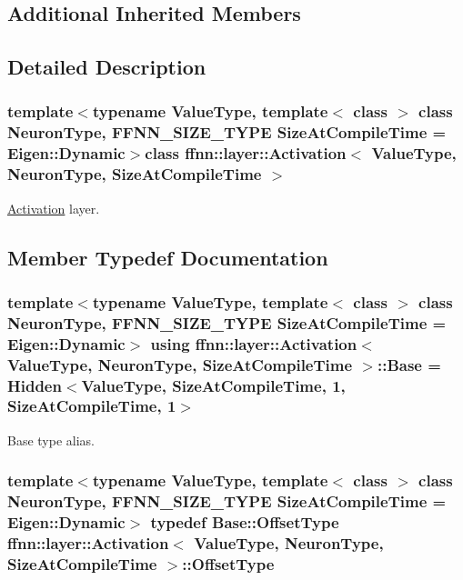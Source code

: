 \subsection*{Additional Inherited Members}


\subsection{Detailed Description}
\subsubsection*{template$<$typename Value\-Type, template$<$ class $>$ class Neuron\-Type, F\-F\-N\-N\-\_\-\-S\-I\-Z\-E\-\_\-\-T\-Y\-P\-E Size\-At\-Compile\-Time = Eigen\-::\-Dynamic$>$class ffnn\-::layer\-::\-Activation$<$ Value\-Type, Neuron\-Type, Size\-At\-Compile\-Time $>$}

\hyperlink{classffnn_1_1layer_1_1_activation}{Activation} layer. 

\subsection{Member Typedef Documentation}
\hypertarget{classffnn_1_1layer_1_1_activation_a201ec82cc70826c458c1f4dc5e7f3fdf}{
\subsubsection[{Base}]{\setlength{\rightskip}{0pt plus 5cm}template$<$typename Value\-Type, template$<$ class $>$ class Neuron\-Type, F\-F\-N\-N\-\_\-\-S\-I\-Z\-E\-\_\-\-T\-Y\-P\-E Size\-At\-Compile\-Time = Eigen\-::\-Dynamic$>$ using {\bf ffnn\-::layer\-::\-Activation}$<$ Value\-Type, Neuron\-Type, Size\-At\-Compile\-Time $>$\-::{\bf Base} =  {\bf Hidden}$<$Value\-Type, Size\-At\-Compile\-Time, 1, Size\-At\-Compile\-Time, 1$>$}}\label{classffnn_1_1layer_1_1_activation_a201ec82cc70826c458c1f4dc5e7f3fdf}


Base type alias. 

\hypertarget{classffnn_1_1layer_1_1_activation_aff203e6e98860cf5887ecc18894619fb}{
\subsubsection[{Offset\-Type}]{\setlength{\rightskip}{0pt plus 5cm}template$<$typename Value\-Type, template$<$ class $>$ class Neuron\-Type, F\-F\-N\-N\-\_\-\-S\-I\-Z\-E\-\_\-\-T\-Y\-P\-E Size\-At\-Compile\-Time = Eigen\-::\-Dynamic$>$ typedef {\bf Base\-::\-Offset\-Type} {\bf ffnn\-::layer\-::\-Activation}$<$ Value\-Type, Neuron\-Type, Size\-At\-Compile\-Time $>$\-::{\bf Offset\-Type}}}\label{classffnn_1_1layer_1_1_activation_aff203e6e98860cf5887ecc18894619fb}


